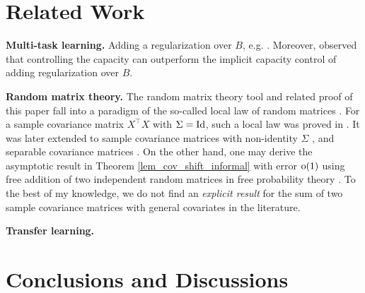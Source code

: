 \section{Related Work}

\textbf{Multi-task learning.}
 Adding a regularization over $B$, e.g. \cite{LPTV09,LPVT11}.
Moreover, \cite{KD12} observed that controlling the capacity can outperform the implicit capacity control of adding regularization over $B$.


\textbf{Random matrix theory.} The random matrix theory tool and related proof of this paper fall into a paradigm of the so-called local law of random matrices \cite{erdos2017dynamical}. For a sample covariance matrix $X^\top X$ with $\Sigma=\operatorname{Id}$, such a local law was proved in \cite{isotropic}. It was later extended to sample covariance matrices with non-identity $\Sigma$ \cite{Anisotropic}, and separable covariance matrices \cite{yang2019spiked}. On the other hand, one may derive the asymptotic result in Theorem \ref{lem_cov_shift_informal} with error $\operatorname{o}(1)$ using free addition of two independent random matrices in free probability theory \cite{nica2006lectures}. To the best of my knowledge, we do not find an {\it explicit result} for the sum of two sample covariance matrices with general covariates in the literature. 


\textbf{Transfer learning.}

\section{Conclusions and Discussions}
